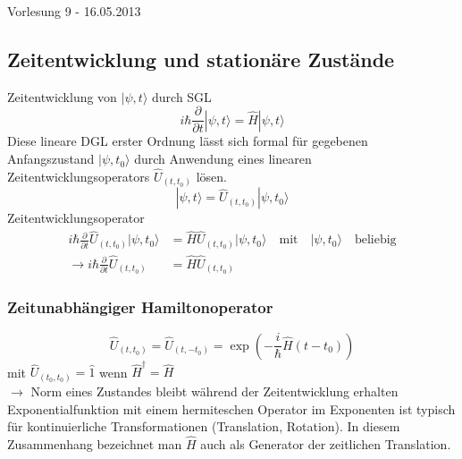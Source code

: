 \documentclass[10pt,article,colorback,accentcolor=tud9d]{scrartcl}
\begin{document}
\begin{flushright}
Vorlesung 9 - 16.05.2013
\end{flushright}

\subsection{Zeitentwicklung und stationäre Zustände}
Zeitentwicklung von $|\psi,t\rangle$ durch SGL 
\begin{equation}
i\hbar \frac{\partial}{\partial t}|\psi,t\rangle=\hat{H}|\psi,t\rangle
\label{eq:Schrödingergleichung}
\end{equation}
Diese lineare DGL erster Ordnung lässt sich formal für gegebenen Anfangszustand $|\psi,t_0\rangle$ durch Anwendung eines linearen Zeitentwicklungsoperators $\hat{U}_{(t,t_0)}$ lösen.
\begin{equation}
|\psi,t\rangle=\hat{U}_{(t,t_0)}|\psi,t_0\rangle
\end{equation}
Zeitentwicklungsoperator
\begin{align}
i\hbar\frac{\partial}{\partial t}\hat{U}_{(t,t_0)}|\psi,t_0\rangle&=\hat{H}\hat{U}_{(t,t_0)}|\psi,t_0\rangle \quad \text{mit} \quad |\psi,t_0\rangle \quad \text{beliebig}\\
\rightarrow i\hbar \frac{\partial}{\partial t}\hat{U}_{(t,t_0)}&=\hat{H}\hat{U}_{(t,t_0)}
\end{align}
\subsubsection{Zeitunabhängiger Hamiltonoperator}
\begin{equation}
\hat{U}_{(t,t_0)}=\hat{U}_{(t,-t_0)}=\exp\left(-\frac{i}{\hbar}\hat{H}(t-t_0)\right)
\end{equation}
mit $\hat{U}_{(t_0,t_0)}=\hat{1}$ wenn $\hat{H}^\dagger=\hat{H}$\\
$\rightarrow$ Norm eines Zustandes bleibt während der Zeitentwicklung erhalten\\
Exponentialfunktion mit einem hermiteschen Operator im Exponenten ist typisch für kontinuierliche Transformationen (Translation, Rotation). In diesem Zusammenhang bezeichnet man $\hat{H}$ auch als Generator der zeitlichen Translation.\\
\end{document}
